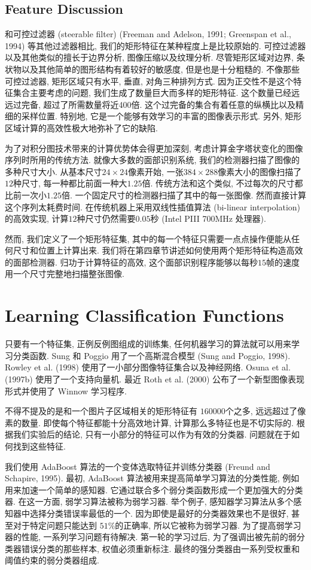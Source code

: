 \documentclass[utf8]{ctexart}
\begin{document}
\subsection{Feature Discussion}
和可控过滤器 (steerable filter) (Freeman and Adelson, 1991; Greenspan et al., 1994) 等其他过滤器相比, 我们的矩形特征在某种程度上是比较原始的. 可控过滤器以及其他类似的擅长于边界分析, 图像压缩以及纹理分析. 
尽管矩形区域对边界, 条状物以及其他简单的图形结构有着较好的敏感度, 但是也是十分粗糙的. 不像那些可控过滤器, 矩形区域只有水平, 垂直, 对角三种排列方式. 因为正交性不是这个特征集合主要考虑的问题, 我们生成了数量巨大而多样的矩形特征. 这个数量已经远远过完备, 超过了所需数量将近400倍.
这个过完备的集合有着任意的纵横比以及精细的采样位置. 特别地, 它是一个能够有效学习的丰富的图像表示形式. 另外, 矩形区域计算的高效性极大地弥补了它的缺陷. 

为了对积分图技术带来的计算优势体会得更加深刻, 考虑计算金字塔状变化的图像序列时所用的传统方法. 就像大多数的面部识别系统, 我们的检测器扫描了图像的多种尺寸大小. 从基本尺寸$24\times24$像素开始, 一张$384\times288$像素大小的图像扫描了$12$种尺寸, 每一种都比前面一种大$1.25$倍.
传统方法和这个类似, 不过每次的尺寸都比前一次小$1.25$倍. 一个固定尺寸的检测器扫描了其中的每一张图像. 然而直接计算这个序列太耗费时间. 在传统机器上采用双线性插值算法 (bi-linear interpolation) 的高效实现, 计算$12$种尺寸仍然需要$0.05$秒 (Intel PIII 700MHz 处理器).

然而, 我们定义了一个矩形特征集, 其中的每一个特征只需要一点点操作便能从任何尺寸和位置上计算出来. 我们将在第四章节讲述如何使用两个矩形特征构造高效的面部检测器. 归功于计算特征的高效, 这个面部识别程序能够以每秒$15$帧的速度用一个尺寸完整地扫描整张图像.

\section{Learning Classification Functions}
只要有一个特征集, 正例反例图组成的训练集, 任何机器学习的算法就可以用来学习分类函数. Sung 和 Poggio 用了一个高斯混合模型 (Sung and Poggio, 1998). Rowley et al. (1998) 使用了一小部分图像特征集合以及神经网络. Osuna et al. (1997b) 使用了一个支持向量机. 最近 Roth et al. (2000) 公布了一个新型图像表现形式并使用了 Winnow 学习程序.

不得不提及的是和一个图片子区域相关的矩形特征有 $160000$个之多, 远远超过了像素的数量. 即使每个特征都能十分高效地计算, 计算那么多特征也是不切实际的. 根据我们实验后的结论, 只有一小部分的特征可以作为有效的分类器. 问题就在于如何找到这些特征.

我们使用 AdaBoost 算法的一个变体选取特征并训练分类器 (Freund and Schapire, 1995). 最初, AdaBoost 算法被用来提高简单学习算法的分类性能, 例如用来加速一个简单的感知器. 它通过联合多个弱分类函数形成一个更加强大的分类器. 在这一方面, 弱学习算法被称为弱学习器.
举个例子, 感知器学习算法从多个感知器中选择分类错误率最低的一个. 因为即使是最好的分类器效果也不是很好, 甚至对于特定问题只能达到 $51\%$的正确率, 所以它被称为弱学习器.
为了提高弱学习器的性能, 一系列学习问题有待解决. 第一轮的学习过后, 为了强调出被先前的弱分类器错误分类的那些样本, 权值必须重新标注. 最终的强分类器由一系列受权重和阈值约束的弱分类器组成.
\end{document}
